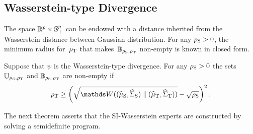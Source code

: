 \documentclass{article}
\begin{document}
\subsection{Wasserstein-type Divergence}
The space $\mathbb{R}^p\times \mathbb{S}_{+}^p$ can be endowed with a distance inherited from the Wasserstein distance between Gaussian distribution. For any $\rho_{\rm S} > 0$, the minimum radius for~$\rho_{\rm T}$ that makes~$\mathbb B_{\rho_{\rm S},\rho_{ \rm T}}$ non-empty is known in closed form.
\begin{proposition}
\label{prop:minimum_radius}
Suppose that $\psi$ is the Wasserstein-type divergence. For any $\rho_{\rm S} >0$ the sets $\mathbb U_{\rho_{\rm S}, \rho_{\rm T}}$ and $\mathbb B_{\rho_{\rm S}, \rho_{\rm T}}$ are non-empty if
\[\rho_{\rm T}\geq \left(\sqrt{\mathds  W((\msa_{\rm S}, \covsa_{\rm S}) \parallel (\msa_{\rm T}, \covsa_{\rm T}))} - \sqrt{\rho_{\rm S}}\right)^{2}.\]
\end{proposition}
The next theorem asserts that the SI-Wasserstein experts are constructed by solving a semidefinite program.
\end{document}
